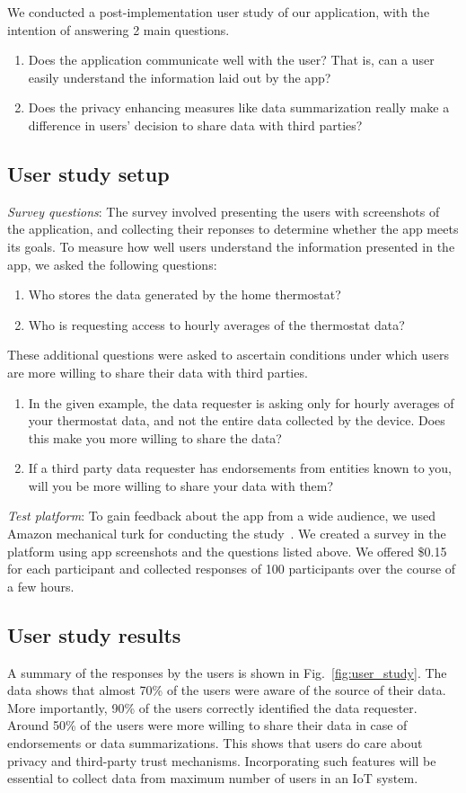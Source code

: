 We conducted a post-implementation user study of our application, with the intention of answering 2 main questions.
\begin{enumerate}
	\item Does the application communicate well with the user? That is, can a user easily understand the information laid out by the app?
	\item Does the privacy enhancing measures like data summarization really make a difference in users' decision to share data with third parties?
\end{enumerate}

\subsection{User study setup}

\textit{Survey questions}: The survey involved presenting the users with screenshots of the application, and collecting their reponses to determine whether the app meets its goals. To measure how well users understand the information presented in the app, we asked the following questions:
\begin{enumerate}
	\item Who stores the data generated by the home thermostat?
	\item Who is requesting access to hourly averages of the thermostat data?
\end{enumerate}

These additional questions were asked to ascertain conditions under which users are more willing to share their data with third parties.
\begin{enumerate}
	\item In the given example, the data requester is asking only for hourly averages of your thermostat data, and not the entire data collected by the device. Does this make you more willing to share the data?
	\item If a third party data requester has endorsements from entities known to you, will you be more willing to share your data with them?
\end{enumerate}

\textit{Test platform}: To gain feedback about the app from a wide audience, we used Amazon mechanical turk for conducting the study~\cite{mturk}. We created a survey in the platform using app screenshots and the questions listed above. We offered \$0.15 for each participant and collected responses of 100 participants over the course of a few hours.

\subsection{User study results}
A summary of the responses by the users is shown in Fig.~\ref{fig:user_study}. The data shows that almost 70\% of the users were aware of the source of their data. More importantly, 90\% of the users correctly identified the data requester. Around 50\% of the users were more willing to share their data in case of endorsements or data summarizations. This shows that users do care about privacy and third-party trust mechanisms. Incorporating such features will be essential to collect data from maximum number of users in an IoT system.